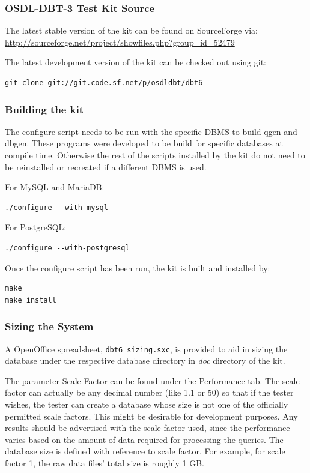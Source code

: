 \documentclass{article}
\begin{document}
\subsubsection{OSDL-DBT-3 Test Kit Source}

The latest stable version of the kit can be found on SourceForge
via: \url{http://sourceforge.net/project/showfiles.php?group\_id=52479}

The latest development version of the kit can be checked out using git:
\lstset{language=sh}
\begin{lstlisting}
git clone git://git.code.sf.net/p/osdldbt/dbt6
\end{lstlisting}

\subsubsection{Building the kit}

The configure script needs to be run with the specific DBMS to build qgen and
dbgen.  These programs were developed to be build for specific databases at
compile time.  Otherwise the rest of the scripts installed by the kit do not
need to be reinstalled or recreated if a different DBMS is used.

For MySQL and MariaDB:
\lstset{language=sh}
\begin{lstlisting}
./configure --with-mysql
\end{lstlisting}

For PostgreSQL:
\lstset{language=sh}
\begin{lstlisting}
./configure --with-postgresql
\end{lstlisting}

Once the configure script has been run, the kit is built and installed by:
\begin{lstlisting}
make
make install
\end{lstlisting}

\subsubsection{Sizing the System}

A OpenOffice spreadsheet, \texttt{dbt6\_sizing.sxc}, is provided to aid in
sizing the database under the respective database directory in \textit{doc}
directory of the kit.

The parameter Scale Factor can be found under the Performance tab.  The scale
factor can actually be any decimal number (like 1.1 or 50) so that if the
tester wishes, the tester can create a database whose size is not one of the
officially permitted scale factors.  This might be desirable for development
purposes.  Any results should be advertised with the scale factor used, since
the performance varies based on the amount of data required for processing the
queries.  The database size is defined with reference to scale factor.  For
example, for scale factor 1, the raw data files' total size is roughly 1 GB.
\end{document}
